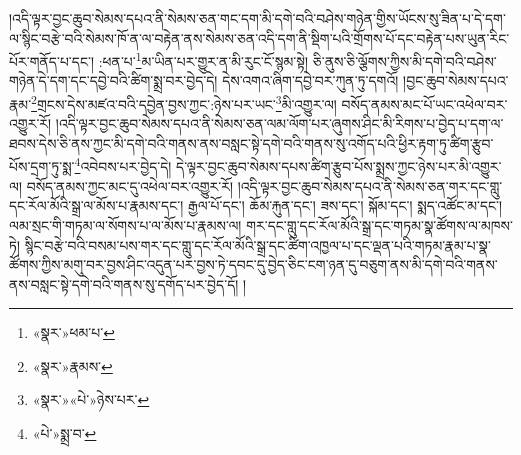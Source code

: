 །འདི་ལྟར་བྱང་ཆུབ་སེམས་དཔའ་ནི་སེམས་ཅན་གང་དག་མི་དགེ་བའི་བཤེས་གཉེན་གྱིས་ཡོངས་སུ་ཟིན་པ་དེ་དག་ལ་སྙིང་བརྩེ་བའི་སེམས་ཁོ་ན་ལ་བརྟེན་ནས་སེམས་ཅན་འདི་དག་ནི་སྡིག་པའི་གྲོགས་པོ་དང་བརྟེན་པས་ཡུན་རིང་པོར་གནོད་པ་དང་། :ཕན་པ་\footnote{«སྣར་»ཕམ་པ་}མ་ཡིན་པར་གྱུར་ན་མི་རུང་ངོ་སྙམ་སྟེ། ཅི་ནུས་ཅི་ལྕོགས་ཀྱིས་མི་དགེ་བའི་བཤེས་གཉེན་དེ་དག་དང་དབྱེ་བའི་ཚིག་སྨྲ་བར་བྱེད་དེ། དེས་འགའ་ཞིག་དབྱེ་བར་ཀུན་ཏུ་དགའོ། །བྱང་ཆུབ་སེམས་དཔའ་རྣམ་\footnote{«སྣར་»རྣམས་}གྲངས་དེས་མཛའ་བའི་དབྱེན་བྱས་ཀྱང་:ཉེས་པར་ཡང་\footnote{«སྣར་»«པེ་»ཉེས་པར་}མི་འགྱུར་ལ། བསོད་ནམས་མང་པོ་ཡང་འཕེལ་བར་འགྱུར་རོ། །འདི་ལྟར་བྱང་ཆུབ་སེམས་དཔའ་ནི་སེམས་ཅན་ལམ་ལོག་པར་ཞུགས་ཤིང་མི་རིགས་པ་བྱེད་པ་དག་ལ་ཐབས་དེས་ཅི་ནས་ཀྱང་མི་དགེ་བའི་གནས་ནས་བསླང་སྟེ་དགེ་བའི་གནས་སུ་འགོད་པའི་ཕྱིར་རྟག་ཏུ་ཚིག་རྩུབ་པོས་དྲག་ཏུ་སྨ་\footnote{«པེ་»སྨྲ་བ་}འབེབས་པར་བྱེད་དེ། དེ་ལྟར་བྱང་ཆུབ་སེམས་དཔས་ཚིག་རྩུབ་པོས་སྨྲས་ཀྱང་ཉེས་པར་མི་འགྱུར་ལ། བསོད་ནམས་ཀྱང་མང་དུ་འཕེལ་བར་འགྱུར་རོ། །འདི་ལྟར་བྱང་ཆུབ་སེམས་དཔའ་ནི་སེམས་ཅན་གར་དང་གླུ་དང་རོལ་མོའི་སྒྲ་ལ་མོས་པ་རྣམས་དང་། རྒྱལ་པོ་དང་། ཆོམ་རྐུན་དང་། ཟས་དང་། སྐོམ་དང་། སྨད་འཚོང་མ་དང་། ལམ་སྲང་གི་གཏམ་ལ་སོགས་པ་ལ་མོས་པ་རྣམས་ལ། གར་དང་གླུ་དང་རོལ་མོའི་སྒྲ་དང་གཏམ་སྣ་ཚོགས་ལ་མཁས་ཏེ། སྙིང་བརྩེ་བའི་བསམ་པས་གར་དང་གླུ་དང་རོལ་མོའི་སྒྲ་དང་ཚིག་འཁྱལ་པ་དང་ལྡན་པའི་གཏམ་རྣམ་པ་སྣ་ཚོགས་ཀྱིས་མགུ་བར་བྱས་ཤིང་འདུན་པར་བྱས་ཏེ་དབང་དུ་བྱེད་ཅིང་ངག་ཉན་དུ་བཅུག་ནས་མི་དགེ་བའི་གནས་ནས་བསླང་སྟེ་དགེ་བའི་གནས་སུ་དགོད་པར་བྱེད་དོ། །
